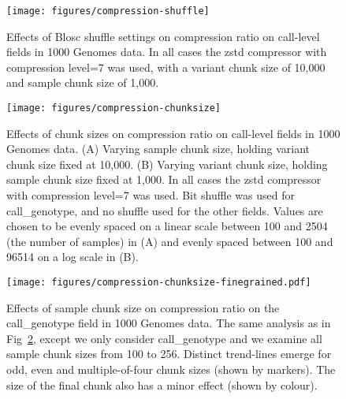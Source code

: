 \documentclass[a4paper,num-refs]{oup-contemporary}
\begin{document}
\begin{figure}[h]
\texttt{[image: figures/compression-shuffle]}
\caption{Effects of Blosc shuffle settings on compression ratio on call-level
fields in 1000 Genomes data.
In all cases the zstd compressor with compression level=7 was used, with a variant
chunk size of 10,000 and sample chunk size of 1,000.
\label{fig-compression-shuffle}}
\end{figure}

\begin{figure}[h]
\texttt{[image: figures/compression-chunksize]}
\caption{Effects of chunk sizes on compression ratio on call-level
fields in 1000 Genomes data.
(A) Varying sample chunk size, holding variant chunk size fixed at 10,000.
(B) Varying variant chunk size, holding sample chunk size fixed at 1,000.
In all cases the zstd compressor with compression level=7 was used. Bit shuffle
was used for call\_genotype, and no shuffle used for the other fields.
Values are chosen to be evenly spaced on a linear scale
between 100 and 2504 (the number of samples) in (A) and
evenly spaced between 100 and 96514 on a log scale in (B).
\label{fig-compression-chunksize}}
\end{figure}

\begin{figure}[h]
\texttt{[image: figures/compression-chunksize-finegrained.pdf]}
\caption{Effects of sample chunk size on compression ratio on the call\_genotype
field in 1000 Genomes data.
The same analysis as in Fig~\ref{fig-compression-chunksize}, except we only
consider call\_genotype and we examine all sample chunk sizes from
100 to 256. Distinct trend-lines emerge for odd, even and multiple-of-four
chunk sizes (shown by markers). The size of the final chunk also has a minor
effect (shown by colour).
\label{fig-compression-chunksize-finegrained}}
\end{figure}
\end{document}
